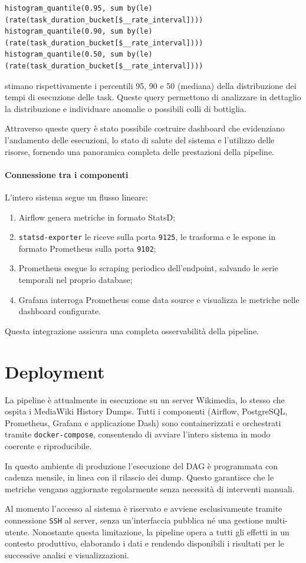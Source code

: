 \begin{verbatim}
histogram_quantile(0.95, sum by(le)(rate(task_duration_bucket[$__rate_interval])))
histogram_quantile(0.90, sum by(le)(rate(task_duration_bucket[$__rate_interval])))
histogram_quantile(0.50, sum by(le)(rate(task_duration_bucket[$__rate_interval])))
\end{verbatim}
stimano rispettivamente i percentili 95, 90 e 50 (mediana) della distribuzione dei tempi di esecuzione delle task. Queste query permettono di analizzare in dettaglio la distribuzione e individuare anomalie o possibili colli di bottiglia.

Attraverso queste query è stato possibile costruire dashboard che evidenziano l'andamento delle esecuzioni, lo stato di salute del sistema e l'utilizzo delle risorse, fornendo una panoramica completa delle prestazioni della pipeline.



\paragraph{Connessione tra i componenti}
L’intero sistema segue un flusso lineare:
\begin{enumerate}
    \item Airflow genera metriche in formato StatsD;
    \item \texttt{statsd-exporter} le riceve sulla porta \texttt{9125}, le trasforma e le espone in formato Prometheus sulla porta \texttt{9102};
    \item Prometheus esegue lo scraping periodico dell’endpoint, salvando le serie temporali nel proprio database;
    \item Grafana interroga Prometheus come data source e visualizza le metriche nelle dashboard configurate.
\end{enumerate}
Questa integrazione assicura una completa osservabilità della pipeline.

\section{Deployment}
\label{sec:impldeployment}

La pipeline è attualmente in esecuzione su un server Wikimedia, lo stesso che ospita 
i MediaWiki History Dumps. Tutti i componenti (Airflow, PostgreSQL, Prometheus, 
Grafana e applicazione Dash) sono containerizzati e orchestrati tramite 
\texttt{docker-compose}, consentendo di avviare l’intero sistema in modo coerente 
e riproducibile. 

In questo ambiente di produzione l'esecuzione del DAG  è programmata 
con cadenza mensile, in linea con il rilascio dei dump. 
Questo garantisce che le metriche vengano aggiornate regolarmente senza 
necessità di interventi manuali. 

Al momento l’accesso al sistema è riservato e avviene esclusivamente tramite 
connessione \texttt{SSH} al server, senza un’interfaccia pubblica né una gestione 
multi-utente. Nonostante questa limitazione, la pipeline opera a tutti gli effetti 
in un contesto produttivo, elaborando i dati e rendendo disponibili i 
risultati per le successive analisi e visualizzazioni.

\clearpage